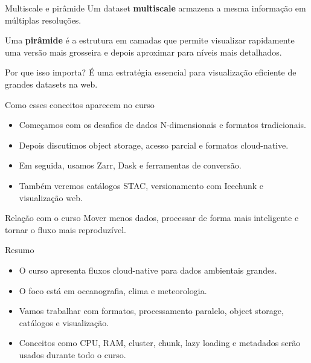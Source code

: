 \documentclass[aspectratio=169]{beamer}
\begin{document}
\begin{frame}{Multiscale e pirâmide}
\Large
Um dataset \textbf{multiscale} armazena a mesma informação em múltiplas resoluções.

\vspace{0.4cm}

Uma \textbf{pirâmide} é a estrutura em camadas que permite visualizar rapidamente uma versão mais grosseira e depois aproximar para níveis mais detalhados.

\vspace{0.4cm}

\begin{block}{Por que isso importa?}
É uma estratégia essencial para visualização eficiente de grandes datasets na web.
\end{block}
\end{frame}

\begin{frame}{Como esses conceitos aparecem no curso}
\begin{itemize}
  \item Começamos com os desafios de dados N-dimensionais e formatos tradicionais.
  \item Depois discutimos object storage, acesso parcial e formatos cloud-native.
  \item Em seguida, usamos Zarr, Dask e ferramentas de conversão.
  \item Também veremos catálogos STAC, versionamento com Icechunk e visualização web.
\end{itemize}

\vspace{0.4cm}

\begin{block}{Relação com o curso}
Mover menos dados, processar de forma mais inteligente e tornar o fluxo mais reproduzível.
\end{block}
\end{frame}

\begin{frame}{Resumo}
\begin{itemize}
  \item O curso apresenta fluxos cloud-native para dados ambientais grandes.
  \item O foco está em oceanografia, clima e meteorologia.
  \item Vamos trabalhar com formatos, processamento paralelo, object storage, catálogos e visualização.
  \item Conceitos como CPU, RAM, cluster, chunk, lazy loading e metadados serão usados durante todo o curso.
\end{itemize}
\end{frame}
\end{document}
